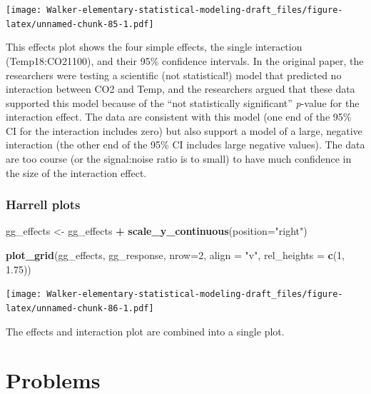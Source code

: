 \documentclass[]{book}
\newenvironment{Shaded}{\begin{snugshade}}{\end{snugshade}}
\newcommand{\KeywordTok}[1]{\textcolor[rgb]{0.13,0.29,0.53}{\textbf{#1}}}
\newcommand{\DataTypeTok}[1]{\textcolor[rgb]{0.13,0.29,0.53}{#1}}
\newcommand{\DecValTok}[1]{\textcolor[rgb]{0.00,0.00,0.81}{#1}}
\newcommand{\FloatTok}[1]{\textcolor[rgb]{0.00,0.00,0.81}{#1}}
\newcommand{\StringTok}[1]{\textcolor[rgb]{0.31,0.60,0.02}{#1}}
\newcommand{\OperatorTok}[1]{\textcolor[rgb]{0.81,0.36,0.00}{\textbf{#1}}}
\newcommand{\NormalTok}[1]{#1}
\begin{document}
\texttt{[image: Walker-elementary-statistical-modeling-draft\_files/figure-latex/unnamed-chunk-85-1.pdf]}

This effects plot shows the four simple effects, the single interaction
(Temp18:CO21100), and their 95\% confidence intervals. In the original
paper, the researchers were testing a scientific (not statistical!)
model that predicted no interaction between CO2 and Temp, and the
researchers argued that these data supported this model because of the
``not statistically significant'' \emph{p}-value for the interaction
effect. The data are consistent with this model (one end of the 95\% CI
for the interaction includes zero) but also support a model of a large,
negative interaction (the other end of the 95\% CI includes large
negative values). The data are too course (or the signal:noise ratio is
to small) to have much confidence in the size of the interaction effect.

\subsubsection{Harrell plots}\label{harrell-plots}

\begin{Shaded}
\begin{Highlighting}[]
\NormalTok{gg_effects <-}\StringTok{ }\NormalTok{gg_effects }\OperatorTok{+}\StringTok{ }\KeywordTok{scale_y_continuous}\NormalTok{(}\DataTypeTok{position=}\StringTok{"right"}\NormalTok{)}

\KeywordTok{plot_grid}\NormalTok{(gg_effects, gg_response, }\DataTypeTok{nrow=}\DecValTok{2}\NormalTok{, }
          \DataTypeTok{align =} \StringTok{"v"}\NormalTok{, }
          \DataTypeTok{rel_heights =} \KeywordTok{c}\NormalTok{(}\DecValTok{1}\NormalTok{, }\FloatTok{1.75}\NormalTok{))}
\end{Highlighting}
\end{Shaded}

\texttt{[image: Walker-elementary-statistical-modeling-draft\_files/figure-latex/unnamed-chunk-86-1.pdf]}

The effects and interaction plot are combined into a single plot.

\section{Problems}\label{problems-3}
\end{document}
